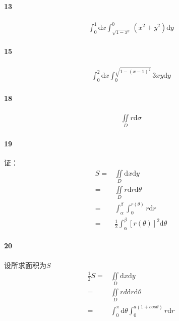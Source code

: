 \documentclass[UTF8]{ctexart}
\begin{document}
\paragraph*{13}
\begin{align*}
    \int_{0}^{1} \mathrm{d}x \int_{\sqrt{1-x^2} }^{0} (x^2 + y^2)\mathrm{d}y 
\end{align*}
\paragraph*{15}
\begin{align*}
    \int_{0}^{2} \mathrm{d}x \int_{0}^{\sqrt{1-(x-1)^2}}3xy \mathrm{d}y 
\end{align*}
\paragraph*{18}
\begin{align*}
    \iint \limits_D r \mathrm{d}\sigma
\end{align*}
\paragraph*{19}
证：
\begin{align*}
    S=& \iint \limits_D \mathrm{d}x \mathrm{d}y \\
     =& \iint \limits_D r \mathrm{d}r \mathrm{d}\theta \\
     =& \int_{\alpha}^{\beta} \int_{0}^{r(\theta)} r \mathrm{d}r \\
     =& \frac{1}{2} \int_{\alpha}^{\beta} [r(\theta)]^2 \mathrm{d}\theta
\end{align*}
\paragraph*{20}
设所求面积为$S$
\begin{align*}
    \frac{1}{2}S=& \iint \limits_D \mathrm{d}x \mathrm{d}y \\
     =& \iint \limits_D rd \mathrm{d}r \mathrm{d}\theta \\
     =& \int_{0}^{\pi} \mathrm{d}\theta \int_{0}^{a(1 + cos\theta)} r \mathrm{d}r
\end{align*}
\end{document}

